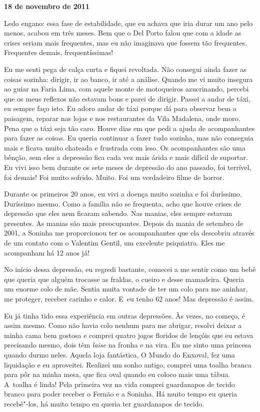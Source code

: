 \begin{center}\asterisc{}\end{center}


\begin{flushright}\textbf{18 de novembro de 2011}\end{flushright}


Ledo engano: essa fase de estabilidade, que eu achava que iria durar um
ano pelo menos, acabou em três meses. Bem que o Del Porto falou que com
a idade as crises seriam mais frequentes, mas eu não imaginava que
fossem tão frequentes. Frequentes demais, frequentíssimas!

Eu me senti pega de calça curta e fiquei revoltada. Não consegui ainda
fazer as coisas sozinha: dirigir, ir ao banco, ir até a análise. Quando
me vi muito insegura ao guiar na Faria Lima, com aquele monte de
motoqueiros azucrinando, percebi que os meus reflexos não estavam bons e
parei de dirigir. Passei a andar de táxi, eu sempre faço isto. Eu adoro
andar de táxi porque dá para observar bem a paisagem, reparar nas lojas
e nos restaurantes da Vila Madalena, onde moro. Pena que o táxi seja tão
caro. Houve dias em que pedi a ajuda de acompanhantes para fazer as
coisas. Eu queria continuar a fazer tudo sozinha, mas não conseguia mais
e ficava muito chateada e frustrada com isso. Os acompanhantes são uma
bênção, sem eles a depressão fica cada vez mais árida e mais difícil de
suportar. Eu vivi isso bem durante os sete meses de depressão do ano
passado, foi terrível, foi demais! Foi muito sofrido. Muito. Foi um
verdadeiro filme de horror.

Durante os primeiros 20 anos, eu vivi a doença muito sozinha e foi
duríssimo. Duríssimo mesmo. Como a família não se frequenta, acho que
houve crises de depressão que eles nem ficaram sabendo. Nas manias, eles
sempre estavam presentes. As manias são mais preocupantes. Depois da
mania de setembro de 2001, a Soninha me proporcionou ter os
acompanhantes que ela descobriu através de um contato com o Valentim
Gentil, um excelente psiquiatra. Eles me acompanham há 12 anos já!

No início dessa depressão, eu regredi bastante, comecei a me sentir como
um bebê que queria que alguém trocasse as fraldas, o cueiro e desse
mamadeira. Queria um enorme colo de mãe. Sentia muita vontade de ter um
colo para me aninhar, me proteger, receber carinho e calor. E~eu tenho
62 anos! Mas depressão é assim.

Eu já tinha tido essa experiência em outras depressões. Às vezes, no
começo, é assim mesmo. Como não havia colo nenhum para me abrigar,
resolvi deixar a minha cama bem gostosa e comprei quatro jogos floridos
de lençóis que eu estava precisando mesmo, dois têm \emph{laise} na
fronha e na vira. Eu me sinto uma princesa quando durmo neles. Aquela
loja fantástica, O Mundo do Enxoval, fez uma liquidação e eu aproveitei.
Realizei um sonho antigo, comprei uma toalha branca para pôr na minha
mesa, que fica oval quando eu coloco mais uma tábua. A~toalha é linda!
Pela primeira vez na vida comprei guardanapos de tecido branco para
poder receber o Fernão e a Soninha. Há muito tempo eu queria recebê"-los,
há muito tempo eu queria ter guardanapos de tecido.

